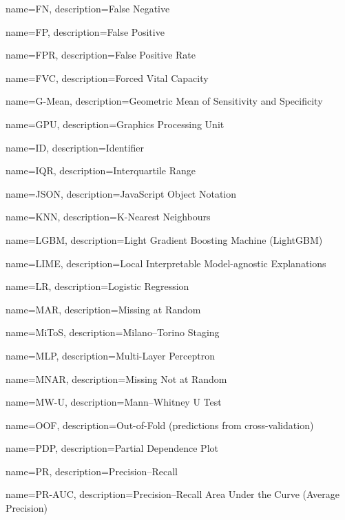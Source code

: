 {
	name=FN,
	description={False Negative}
}

{
	name=FP,
	description={False Positive}
}

{
	name=FPR,
	description={False Positive Rate}
}

{
	name=FVC,
	description={Forced Vital Capacity}
}

{
	name=G-Mean,
	description={Geometric Mean of Sensitivity and Specificity}
}

{
	name=GPU,
	description={Graphics Processing Unit}
}

{
	name=ID,
	description={Identifier}
}

{
    name=IQR,
    description={Interquartile Range}
}

{
	name=JSON,
	description={JavaScript Object Notation}
}

{
	name=KNN,
	description={K-Nearest Neighbours}
}

{
	name=LGBM,
	description={Light Gradient Boosting Machine (LightGBM)}
}

{
	name=LIME,
	description={Local Interpretable Model-agnostic Explanations}
}

{
	name=LR,
	description={Logistic Regression}
}

{
	name=MAR,
	description={Missing at Random}
}

{
	name=MiToS,
	description={Milano--Torino Staging}
}

{
	name=MLP,
	description={Multi-Layer Perceptron}
}

{
	name=MNAR,
	description={Missing Not at Random}
}

{
	name=MW-U,
	description={Mann--Whitney U Test}
}

{
	name=OOF,
	description={Out-of-Fold (predictions from cross-validation)}
}

{
	name=PDP,
	description={Partial Dependence Plot}
}

{
	name=PR,
	description={Precision--Recall}
}

{
	name=PR-AUC,
	description={Precision--Recall Area Under the Curve (Average Precision)}
}

